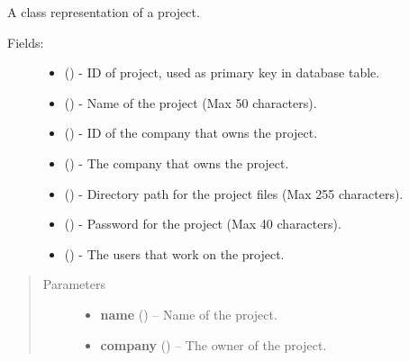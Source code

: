 \documentclass[letterpaper,10pt,english]{sphinxmanual}
\begin{document}
\begin{fulllineitems}
\label{api:models.Project}
A class representation of a project.
\begin{description}
\item[{Fields:}] \leavevmode\begin{itemize}
\item {} 
 () - ID of project, used as primary key in database table.

\item {} 
 () - Name of the project (Max 50 characters).

\item {} 
 () - ID of the company that owns the project.

\item {} 
 () - The company that owns the project.

\item {} 
 () - Directory path for the project files (Max 255 characters).

\item {} 
 () - Password for the project (Max 40 characters).

\item {} 
 () - The users that work on the project.

\end{itemize}

\end{description}
\begin{quote}\begin{description}
\item[{Parameters}] \leavevmode\begin{itemize}
\item {} 
\textbf{name} () -- Name of the project.

\item {} 
\textbf{company} ({\hyperref[api:models.Company]{}}) -- The owner of the project.

\end{itemize}

\end{description}\end{quote}

\end{fulllineitems}
\end{document}
